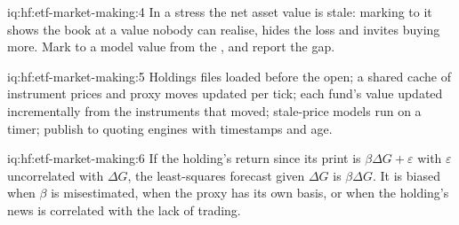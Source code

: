 \begin{solution}{iq:hf:etf-market-making:4}
In a stress the net asset value is stale: marking to it shows the book at a value nobody can realise, hides the loss and invites buying more. Mark
to a model value from the , and report the gap.
\end{solution}

\begin{solution}{iq:hf:etf-market-making:5}
Holdings files loaded before the open; a shared cache of instrument prices and proxy moves updated per tick; each fund's value updated incrementally
from the instruments that moved; stale-price models run on a timer; publish to quoting engines with timestamps and age.
\end{solution}

\begin{solution}{iq:hf:etf-market-making:6}
If the holding's return since its print is $\beta\Delta G+\varepsilon$ with $\varepsilon$ uncorrelated with $\Delta G$, the least-squares forecast
given $\Delta G$ is $\beta\Delta G$. It is biased when $\beta$ is misestimated, when the proxy has its own basis, or when the holding's news is
correlated with the lack of trading.
\end{solution}
